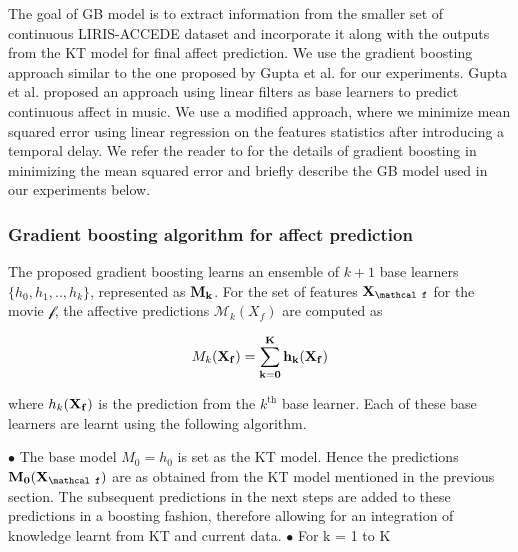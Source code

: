 \documentclass{article}
\begin{document}
The goal of GB model is to extract information from the smaller set of continuous LIRIS-ACCEDE dataset and incorporate it along with the outputs from the KT model for final affect prediction.
We use the gradient boosting approach similar to the one proposed by Gupta et al. \cite{gupta2015affect} for our experiments.
Gupta et al. \cite{gupta2015affect} proposed an approach using linear filters as base learners to predict continuous affect in music. 
We use a modified approach, where we minimize mean squared error using linear regression on the features statistics after introducing a temporal delay.
We refer the reader to \cite{friedman2001greedy,gupta2015affect} for the details of gradient boosting in minimizing the mean squared error and briefly describe the GB model used in our experiments below. 

\subsubsection{Gradient boosting algorithm for affect prediction}
The proposed gradient boosting learns an ensemble of $k+1$ base learners $\{h_0, h_1, .., h_k\}$, represented as $\bf M_k$. 
For the set of features $\bf X_{\mathcal f}$ for the movie $\mathcal f$, the affective predictions $\mathcal M_k(X_f)$ are computed as  

\begin{equation}
\mathcal \bf M_k(\bf X_f) = \sum_{k=0}^K h_k(\bf X_f)
\end{equation}

where $h_k(\bf X_f)$ is the prediction from the $k^\text{th}$ base learner.
Each of these base learners are learnt using the following algorithm.

$\bullet$ The base model $M_0 = h_0$ is set as the KT model. Hence the predictions $\bf M_0(\bf X_\mathcal f)$ are as obtained from the KT model mentioned in the previous section. The subsequent predictions in the next steps are added to these predictions in a boosting fashion, therefore allowing for an integration of knowledge learnt from KT and current data. 
$\bullet$ For k = 1 to K 
\end{document}
